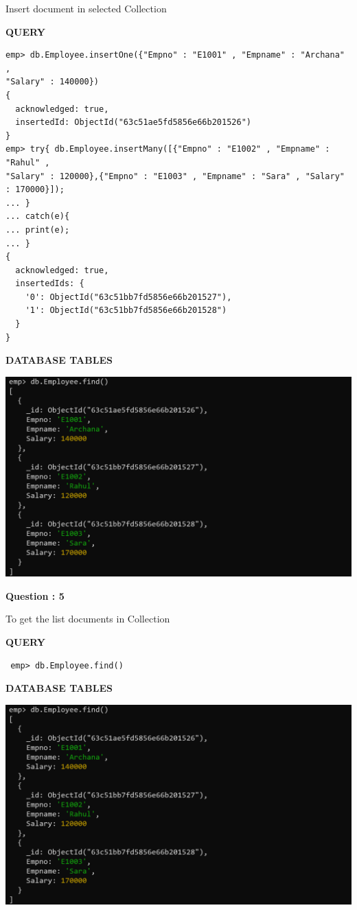 \documentclass[a4paper,12pt]{report}
\begin{document}
Insert document in selected Collection
\begin{flushleft}
\textbf{QUERY }
\end{flushleft}
 \begin{verbatim}
emp> db.Employee.insertOne({"Empno" : "E1001" , "Empname" : "Archana" ,
"Salary" : 140000})
{
  acknowledged: true,
  insertedId: ObjectId("63c51ae5fd5856e66b201526")
}
emp> try{ db.Employee.insertMany([{"Empno" : "E1002" , "Empname" : "Rahul" ,
"Salary" : 120000},{"Empno" : "E1003" , "Empname" : "Sara" , "Salary" : 170000}]);
... }
... catch(e){
... print(e);
... }
{
  acknowledged: true,
  insertedIds: {
    '0': ObjectId("63c51bb7fd5856e66b201527"),
    '1': ObjectId("63c51bb7fd5856e66b201528")
  }
}
\end{verbatim}

\begin{flushleft}
\textbf{DATABASE TABLES}
\end{flushleft}
\includegraphics[scale=0.3]{M4.2.png}
\begin{flushleft}
    \textbf{Question : 5}
\end{flushleft}
To get the list documents in Collection
\begin{flushleft}
\textbf{QUERY }
\end{flushleft}
 \begin{verbatim}
 emp> db.Employee.find()
\end{verbatim}
\begin{flushleft}
\textbf{DATABASE TABLES}
\end{flushleft}
\includegraphics[scale=0.3]{M4.2.png}
\end{document}

